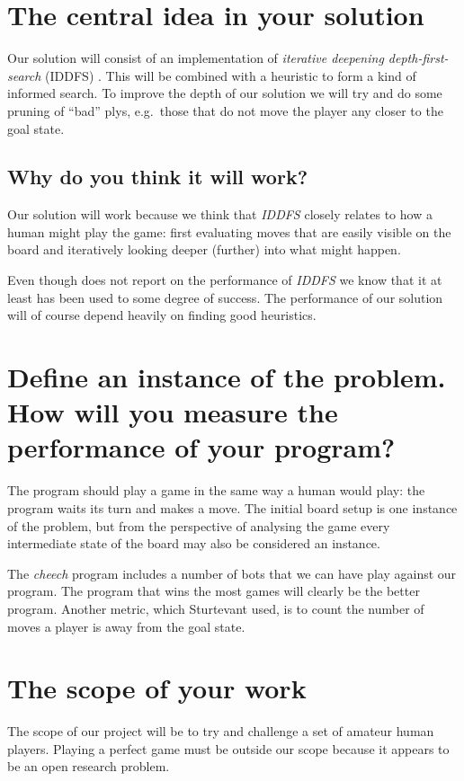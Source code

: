 \documentclass[a4paper,11pt]{report}
\begin{document}
\section{The central idea in your solution}
Our solution will consist of an implementation of \emph{iterative
  deepening depth-first-search} (IDDFS) \cite{aimodern}. This will be
combined with a heuristic to form a kind of informed search. To
improve the depth of our solution we will try and do some pruning of
``bad'' plys, e.g.~those that do not move the player any closer to the
goal state.

\subsection{Why do you think it will work?}
Our solution will work because we think that \emph{IDDFS} closely
relates to how a human might play the game: first evaluating
moves that are easily visible on the board and iteratively looking
deeper (further) into what might happen.

Even though \cite{Huang:2001:SGP:378593.378708} does not report on the
performance of \emph{IDDFS} we know that it at least has been used to
some degree of success. The performance of our solution will of course
depend heavily on finding good heuristics.

\section{Define an instance of the problem. How will you measure the performance of your program?} 

The program should play a game in the same way a human would play: the
program waits its turn and makes a move. The initial board setup is
one instance of the problem, but from the perspective of analysing the
game every intermediate state of the board may also be considered an
instance.

The \emph{cheech} program includes a number of bots that we can have
play against our program. The program that wins the most games will
clearly be the better program. Another metric, which Sturtevant used,
is to count the number of moves a player is away from the goal state.

\section{The scope of your work} 
The scope of our project will be to try and challenge a set of amateur
human players. Playing a perfect game must be outside our scope
because it appears to be an open research problem.
\end{document}

